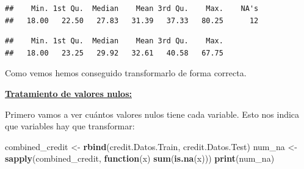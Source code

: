 \documentclass[
]{article}
\newenvironment{Shaded}{\begin{snugshade}}{\end{snugshade}}
\newcommand{\ControlFlowTok}[1]{\textcolor[rgb]{0.13,0.29,0.53}{\textbf{#1}}}
\newcommand{\DecValTok}[1]{\textcolor[rgb]{0.00,0.00,0.81}{#1}}
\newcommand{\FunctionTok}[1]{\textcolor[rgb]{0.13,0.29,0.53}{\textbf{#1}}}
\newcommand{\NormalTok}[1]{#1}
\newcommand{\OtherTok}[1]{\textcolor[rgb]{0.56,0.35,0.01}{#1}}
\newcommand{\SpecialCharTok}[1]{\textcolor[rgb]{0.81,0.36,0.00}{\textbf{#1}}}
\begin{document}
\begin{Shaded}
\end{Shaded}

\begin{verbatim}
##    Min. 1st Qu.  Median    Mean 3rd Qu.    Max.    NA's 
##   18.00   22.50   27.83   31.39   37.33   80.25      12
\end{verbatim}

\begin{Shaded}
\end{Shaded}

\begin{verbatim}
##    Min. 1st Qu.  Median    Mean 3rd Qu.    Max. 
##   18.00   23.25   29.92   32.61   40.58   67.75
\end{verbatim}

Como vemos hemos conseguido transformarlo de forma correcta.

\ul{\textbf{Tratamiento de valores nulos:}}

Primero vamos a ver cuántos valores nulos tiene cada variable. Esto nos
indica que variables hay que transformar:

\begin{Shaded}
\begin{Highlighting}[]
\NormalTok{combined\_credit }\OtherTok{\textless{}{-}} \FunctionTok{rbind}\NormalTok{(credit.Datos.Train, credit.Datos.Test)}
\NormalTok{num\_na }\OtherTok{\textless{}{-}} \FunctionTok{sapply}\NormalTok{(combined\_credit, }\ControlFlowTok{function}\NormalTok{(x) }\FunctionTok{sum}\NormalTok{(}\FunctionTok{is.na}\NormalTok{(x)))}
\FunctionTok{print}\NormalTok{(num\_na)}
\end{Highlighting}
\end{Shaded}
\end{document}
